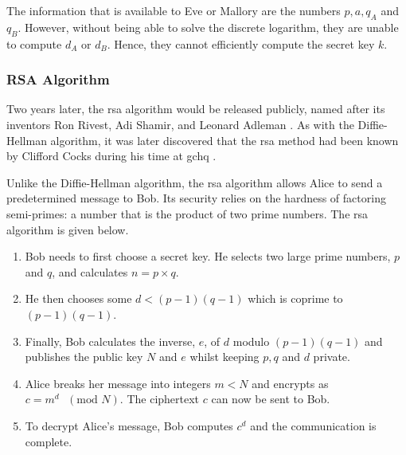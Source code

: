 The information that is available to Eve or Mallory are the numbers $p, a, q_{A}$ and $q_{B}$. However, without being able to solve the discrete logarithm, they are unable to compute $d_A$ or $d_B$. Hence, they cannot efficiently compute the secret key $k$.  



\subsubsection*{RSA Algorithm}

Two years later, the \ac{rsa} algorithm would be released publicly, named after its inventors Ron Rivest, Adi Shamir, and Leonard Adleman \cite{rivest1978method}. As with the Diffie-Hellman algorithm, it was later discovered that the \ac{rsa} method had been known by Clifford Cocks during his time at \ac{gchq} \cite{Cocks1973}. 

Unlike the Diffie-Hellman algorithm, the \ac{rsa} algorithm allows Alice to send a predetermined message to Bob. Its security relies on the hardness of factoring semi-primes: a number that is the product of two prime numbers. The \ac{rsa} algorithm is given below.


\begin{algorithm}
\begin{enumerate}
	\item Bob needs to first choose a secret key. He selects two large prime numbers, $p$ and $q$, and calculates $n = p \times q$.
	\item He then chooses some $d < (p-1)(q-1)$ which is coprime to $(p-1)(q-1)$.
	\item Finally, Bob calculates the inverse, $e$, of $d$ modulo $(p-1)(q-1)$ and publishes the public key $N$ and $e$ whilst keeping $p,q$ and $d$ private.
	\item Alice breaks her message into integers $m < N$ and encrypts as $c = m^d\text{ }(\text{mod }N)$. The ciphertext $c$ can now be sent to Bob.
	\item To decrypt Alice's message, Bob computes $c^d$ and the communication is complete. 
\end{enumerate}   
\end{algorithm}

